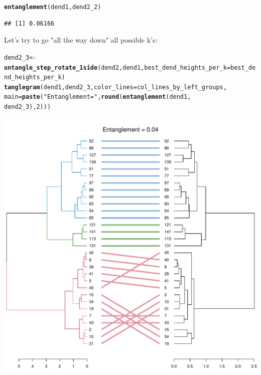 \documentclass[shortnames,nojss,article]{jss}\usepackage[]{graphicx}\usepackage[]{color}
\makeatletter
\def\maxwidth{ %
  \ifdim\Gin@nat@width>\linewidth
    \linewidth
  \else
    \Gin@nat@width
  \fi
}
\newcommand{\hlnum}[1]{\textcolor[rgb]{0.686,0.059,0.569}{#1}}%
\newcommand{\hlstr}[1]{\textcolor[rgb]{0.192,0.494,0.8}{#1}}%
\newcommand{\hlstd}[1]{\textcolor[rgb]{0.345,0.345,0.345}{#1}}%
\newcommand{\hlkwb}[1]{\textcolor[rgb]{0.69,0.353,0.396}{#1}}%
\newcommand{\hlkwc}[1]{\textcolor[rgb]{0.333,0.667,0.333}{#1}}%
\newcommand{\hlkwd}[1]{\textcolor[rgb]{0.737,0.353,0.396}{\textbf{#1}}}%
\newenvironment{kframe}{%
 \def\at@end@of@kframe{}%
 \ifinner\ifhmode%
  \def\at@end@of@kframe{\end{minipage}}%
  \begin{minipage}{\columnwidth}%
 \fi\fi%
 \def\FrameCommand##1{\hskip\@totalleftmargin \hskip-\fboxsep
 \colorbox{shadecolor}{##1}\hskip-\fboxsep
     \hskip-\linewidth \hskip-\@totalleftmargin \hskip\columnwidth}%
 \MakeFramed {\advance\hsize-\width
   \@totalleftmargin\z@ \linewidth\hsize
   \@setminipage}}%
 {\par\unskip\endMakeFramed%
 \at@end@of@kframe}
\newenvironment{knitrout}{}{} %
\makeatother
\begin{document}
\begin{knitrout}
{}


\begin{kframe}\begin{alltt}
\hlkwd{entanglement}\hlstd{(dend1, dend2_2)}
\end{alltt}
\begin{verbatim}
## [1] 0.06166
\end{verbatim}
\end{kframe}
\end{knitrout}



Let's try to go "all the way down" all possible k's:

\begin{knitrout}
\color{fgcolor}\begin{kframe}
\begin{alltt}
\hlstd{dend2_3} \hlkwb{<-} \hlkwd{untangle_step_rotate_1side}\hlstd{(dend2, dend1,} \hlkwc{best_dend_heights_per_k} \hlstd{= best_dend_heights_per_k)}
\hlkwd{tanglegram}\hlstd{(dend1, dend2_3,} \hlkwc{color_lines} \hlstd{= col_lines_by_left_groups,}
    \hlkwc{main} \hlstd{=} \hlkwd{paste}\hlstd{(}\hlstr{"Entanglement ="}\hlstd{,} \hlkwd{round}\hlstd{(}\hlkwd{entanglement}\hlstd{(dend1,}
        \hlstd{dend2_3),} \hlnum{2}\hlstd{)))}
\end{alltt}
\end{kframe}

{\centering \includegraphics[width=\maxwidth]{figure/unnamed-chunk-37} 

}
\end{knitrout}
\end{document}

